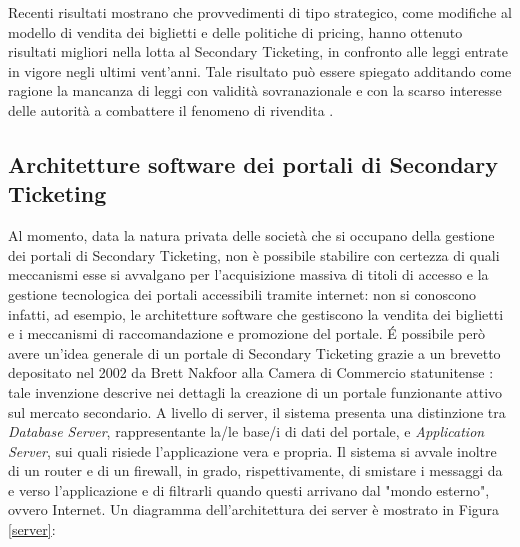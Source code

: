 Recenti risultati mostrano che provvedimenti di tipo strategico, come modifiche al modello di vendita dei biglietti e delle politiche di pricing, hanno ottenuto risultati migliori nella lotta al Secondary Ticketing, in confronto alle leggi entrate in vigore negli ultimi vent'anni. 
Tale risultato può essere spiegato additando come ragione la mancanza di leggi con validità sovranazionale e con la scarso interesse delle autorità a combattere il fenomeno di rivendita \cite{drayer2011examining}.
\subsection{Architetture software dei portali di Secondary Ticketing}
Al momento, data la natura privata delle società che si occupano della gestione dei portali di Secondary Ticketing, non è possibile stabilire con certezza di quali meccanismi esse si avvalgano per l'acquisizione massiva di titoli di accesso e la gestione tecnologica dei portali accessibili tramite internet: non si conoscono infatti, ad esempio, le architetture software che gestiscono la vendita dei biglietti e i meccanismi di raccomandazione e promozione del portale. \'E possibile però avere un'idea generale di un portale di Secondary Ticketing grazie a un brevetto depositato nel 2002 da Brett Nakfoor alla Camera di Commercio statunitense \cite{nakfoor2002electronic}: tale invenzione descrive nei dettagli la creazione di un portale funzionante attivo sul mercato secondario. 
A livello di server, il sistema presenta una distinzione tra \textit{Database Server}, rappresentante la/le base/i di dati del portale, e \textit{Application Server}, sui quali risiede l'applicazione vera e propria. Il sistema si avvale inoltre di un router e di un firewall, in grado, rispettivamente, di smistare i messaggi da e verso l'applicazione e di filtrarli quando questi arrivano dal "mondo esterno", ovvero Internet. Un diagramma dell'architettura dei server è mostrato in Figura \ref{server}:
